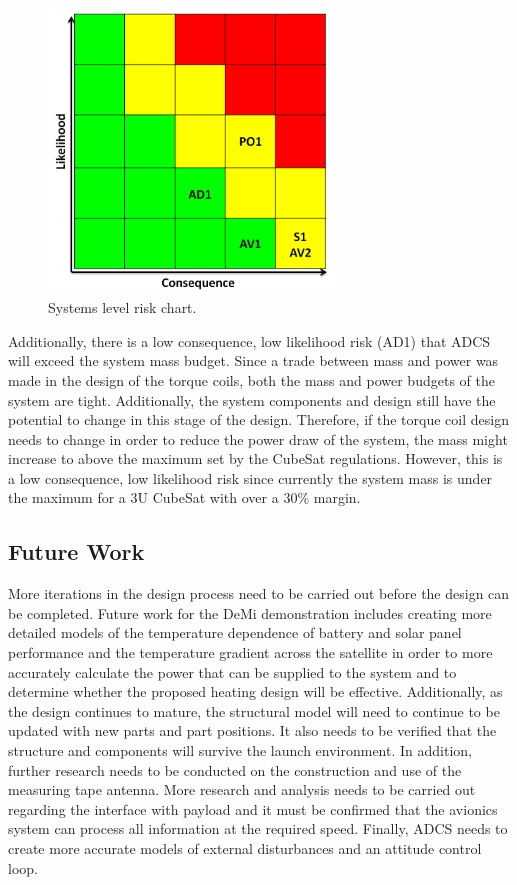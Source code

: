 \documentclass[12pt]{article}
\begin{document}
\begin{figure}[ht]
\centering
\includegraphics[width=3in]{images/conclusion_1.png}
\caption{Systems level risk chart.}
\label{fig:risk_chart}
\end{figure}

Additionally, there is a low consequence, low likelihood risk (AD1) that ADCS will exceed the system mass budget.  Since a trade between mass and power was made in the design of the torque coils, both the mass and power budgets of the system are tight.  Additionally, the system components and design still have the potential to change in this stage of the design.  Therefore, if the torque coil design needs to change in order to reduce the power draw of the system, the mass might increase to above the maximum set by the CubeSat regulations.  However, this is a low consequence, low likelihood risk since currently the system mass is under the maximum for a 3U CubeSat with over a $30\%$ margin.

		\subsection{Future Work}

More iterations in the design process need to be carried out before the design can be completed.  Future work for the DeMi demonstration includes creating more detailed models of the temperature dependence of battery and solar panel performance and the temperature gradient across the satellite in order to more accurately calculate the power that can be supplied to the system and to determine whether the proposed heating design will be effective.  Additionally, as the design continues to mature, the structural model will need to continue to be updated with new parts and part positions.  It also needs to be verified that the structure and components will survive the launch environment. In addition, further research needs to be conducted on the construction and use of the measuring tape antenna.  More research and analysis needs to be carried out regarding the interface with payload and it must be confirmed that the avionics system can process all information at the required speed.  Finally, ADCS needs to create more accurate models of external disturbances and an attitude control loop.
\end{document}
